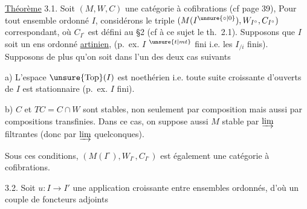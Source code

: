 
\uline{Théorème} 3.1. Soit $(M,W,C)$ une catégorie à cofibrations (cf page 39),  Pour tout ensemble ordonné $I$, considérons le triple $(M(I^{\unsure{\circ|0}}),W_{I^\circ},C_{I^\circ})$ correspondant, où $C_{I^\circ}$ est défini au \S{}2 (cf à ce sujet le th.~2.1). Supposons que  $I$ soit un ens ordonné \uline{artinien}, (p.\ ex. $I$ $^{\unsure{t|mt}}$ fini i.e. les $I_{/i}$ finis). Supposons de plus qu'on soit dans l'un des deux cas suivants

a) L'espace $\unsure{\mathrm{Top}}(I)$ est noethérien i.e. toute suite croissante d'ouverts de $I$ est stationnaire (p.\ ex. $I$ fini).

b) $C$ et $TC=C\cap W$ sont stables, non seulement par composition  mais aussi par compositions transfinies. Dans ce cas, on suppose aussi $M$ stable par  $\varinjlim$  filtrantes (donc par  $\varinjlim$ quelconques).

Sous ces conditions, $(M(I^\circ),W_{I^\circ},C_{I^\circ})$ est également une catégorie à cofibrations.

\uline{}  3.2. Soit $u:I\longrightarrow I'$ une application croissante entre ensembles ordonnés, d'où un couple de foncteurs adjoints

